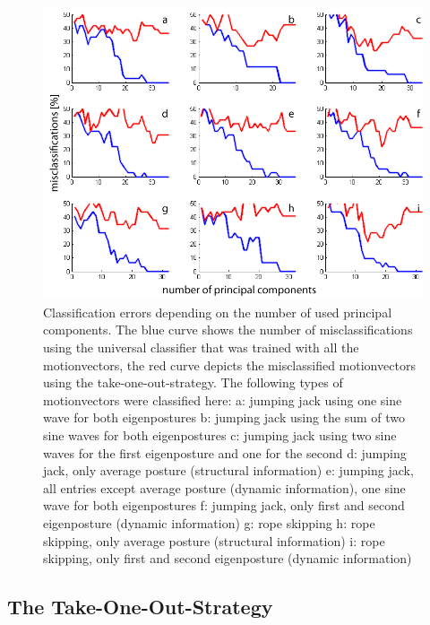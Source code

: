\documentclass[a4paper]{article}
\begin{document}
\begin{figure}
		\centering
		\includegraphics[width=\textwidth]{klassifikation.png}
		\caption{Classification errors depending on the number of used principal components.
		The blue curve shows the number of misclassifications using the universal classifier that was trained with all the motionvectors, the red curve depicts the misclassified motionvectors using the take-one-out-strategy.
		The following types of motionvectors were classified here:
		a: jumping jack using one sine wave for both eigenpostures
		b: jumping jack using the sum of two sine waves for both eigenpostures
		c: jumping jack using two sine waves for the first eigenposture and one for the second
		d: jumping jack, only average posture (structural information)
		e: jumping jack, all entries except average posture (dynamic information), one sine wave for both eigenpostures
		f: jumping jack, only first and second eigenposture (dynamic information)
		g: rope skipping
		h: rope skipping, only average posture (structural information)
		i: rope skipping, only first and second eigenposture (dynamic information)}
		\label{fig:classification}
\end{figure}

\subsection{The Take-One-Out-Strategy}
\end{document}
